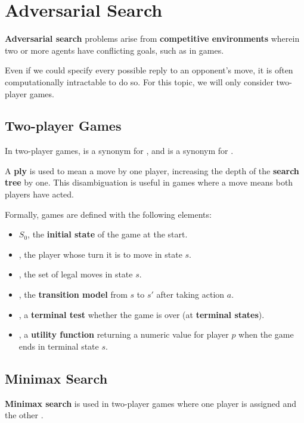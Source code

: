 \section{Adversarial Search}
    \textbf{Adversarial search} problems arise from \textbf{competitive environments} wherein two or more agents have conflicting goals, such as in games.

    Even if we could specify every possible reply to an opponent's move, it is often computationally intractable to do so.
    For this topic, we will only consider two-player games.

    \subsection{Two-player Games}
        In two-player games, \textbf{} is a synonym for , and \textbf{} is a synonym for .

        A \textbf{ply} is used to mean a move by one player, increasing the depth of the \textbf{search tree} by one. This disambiguation is useful in games where a move means both players have acted.

        Formally, games are defined with the following elements:
        \begin{itemize}
            \item $S_0$, the \textbf{initial state} of the game at the start.
            \item {}, the player whose turn it is to move in state $s$.
            \item {}, the set of legal moves in state $s$.
            \item {}, the \textbf{transition model} from $s$ to $s'$ after taking action $a$.
            \item {}, a \textbf{terminal test} whether the game is over (at \textbf{terminal states}).
            \item {}, a \textbf{utility function} returning a numeric value for player $p$ when the game ends in terminal state $s$.
        \end{itemize}

    \subsection{Minimax Search}
        \textbf{Minimax search} is used in two-player games where one player is assigned  and the other .

